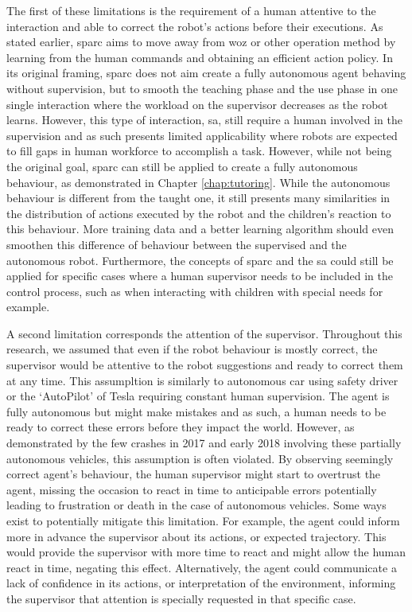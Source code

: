 The first of these limitations is the requirement of a human attentive to the interaction and able to correct the robot's actions before their executions. As stated earlier, \gls{sparc} aims to move away from \gls{woz} or other operation method by learning from the human commands and obtaining an efficient action policy. In its original framing, \gls{sparc} does not aim create a fully autonomous agent behaving without supervision, but to smooth the teaching phase and the use phase in one single interaction where the workload on the supervisor decreases as the robot learns. However, this type of interaction, \gls{sa}, still require a human involved in the supervision and as such presents limited applicability where robots are expected to fill gaps in human workforce to accomplish a task. However, while not being the original goal, \gls{sparc} can still be applied to create a fully autonomous behaviour, as demonstrated in Chapter \ref{chap:tutoring}. While the autonomous behaviour is different from the taught one, it still presents many similarities in the distribution of actions executed by the robot and the children's reaction to this behaviour. More training data and a better learning algorithm should even smoothen this difference of behaviour between the supervised and the autonomous robot. Furthermore, the concepts of \gls{sparc} and the \gls{sa} could still be applied for specific cases where a human supervisor needs to be included in the control process, such as when interacting with children with special needs for example.

A second limitation corresponds the attention of the supervisor. Throughout this research, we assumed that even if the robot behaviour is mostly correct, the supervisor would be attentive to the robot suggestions and ready to correct them at any time. This assumpltion is similarly to autonomous car using safety driver or the `AutoPilot' of Tesla requiring constant human supervision. The agent is fully autonomous but might make mistakes and as such, a human needs to be ready to correct these errors before they impact the world. However, as demonstrated by the few crashes in 2017 and early 2018 involving these partially autonomous vehicles, this assumption is often violated. By observing seemingly correct agent's behaviour, the human supervisor might start to overtrust the agent, missing the occasion to react in time to anticipable errors potentially leading to frustration or death in the case of autonomous vehicles. Some ways exist to potentially mitigate this limitation. For example, the agent could inform more in advance the supervisor about its actions, or expected trajectory. This would provide the supervisor with more time to react and might allow the human react in time, negating this effect. Alternatively, the agent could communicate a lack of confidence in its actions, or interpretation of the environment, informing the supervisor that attention is specially requested in that specific case.

